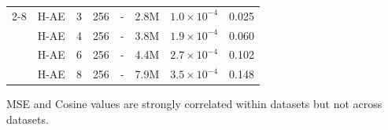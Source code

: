 \begin{table}[ht]
\begin{center}
\begin{tabular}{l l c c c c | c c}
    \cline{2-8}
    & H-AE          &  3 & 256 & - & 2.8M & $1.0 \times 10^{-4}$ & 0.025 \\
    & H-AE          &  4 & 256 & - & 3.8M & $1.9 \times 10^{-4}$ & 0.060 \\
    & H-AE          &  6 & 256 & - & 4.4M & $2.7 \times 10^{-4}$ & 0.102 \\
    & H-AE          &  8 & 256 & - & 7.9M & $3.5 \times 10^{-4}$ & 0.148
\end{tabular}
\end{center}
{MSE and Cosine values are strongly correlated within datasets but not across datasets.}
\label{table:mse_and_cosine}
\end{table}


